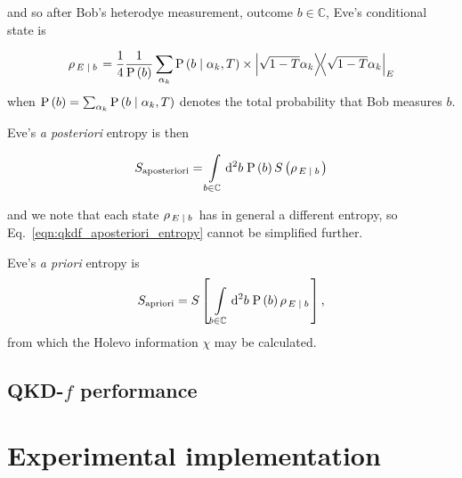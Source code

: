 \noindent and so after Bob's heterodye measurement, outcome $b \in \mathbb{C}$, Eve's conditional state is

\begin{equation}\label{eqn:qkdf_eve_conditional}
\rho_{\left. E \given b\right.} = \frac{1}{4} \frac{1}{\text{P}\left(b\right)} \sum_{\alpha_k} \text{P}\left(b \given \alpha_k, T\right) \times \dyad{\sqrt{1-T}\alpha_k}_E
\end{equation}
when $\text{P}\left(b\right) = \sum_{\alpha_k}\text{P}\left(b \; \middle| \; \alpha_k, T\right)$ denotes the total probability that Bob measures $b$.

Eve's \emph{a posteriori} entropy is then

\begin{equation}\label{eqn:qkdf_aposteriori_entropy}
S_{\text{aposteriori}} = \int\limits_{b \in \mathbb{C}} \mathop{}\!\mathrm{d^2} b \; \text{P}\left(b\right) S\left(\rho_{\left. E \; \middle| \; b \right.}\right)
\end{equation}

\noindent and we note that each state $\rho_{\left.E\; \middle| \; b \right.}$ has in general a different entropy, so Eq.~\ref{eqn:qkdf_aposteriori_entropy} cannot be simplified further. 

Eve's \emph{a priori} entropy is
\begin{equation}\label{eqn:qkdf_apriori_entropy}
S_{\text{apriori}} = S\left[\, \int\limits_{b \in \mathbb{C}} \mathop{}\!\mathrm{d^2} b \; \text{P}\left(b\right) \rho_{\left. E \; \middle| \; b \right.}\right],
\end{equation}
from which the Holevo information $\chi$ may be calculated.

\subsection{QKD-$f$ performance}



\section{Experimental implementation}

